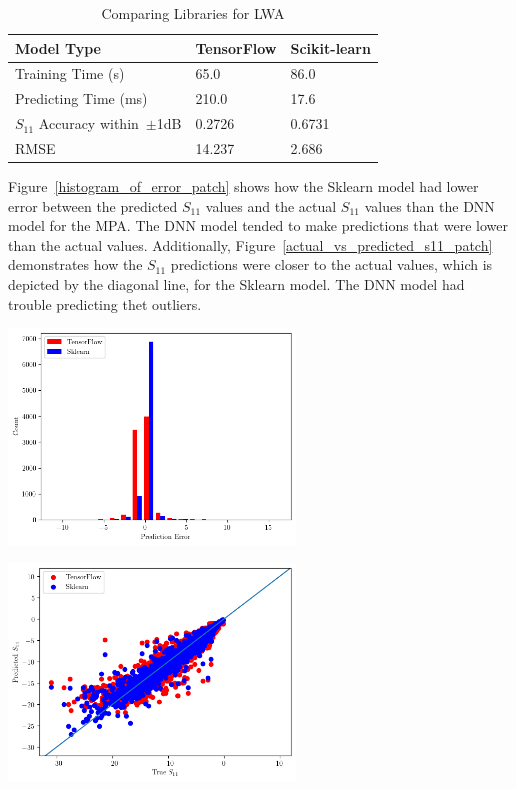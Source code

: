 \documentclass[conference]{IEEEtran}
\newenvironment{Figure}
    {\par\medskip\noindent\minipage{\linewidth}}
    {\endminipage\par\medskip}
\begin{document}
\begin{table}[h]
\caption{Comparing Libraries for LWA}
\begin{center}
\begin{tabular}{ |l|l|l| }
    \hline
    Model Type & TensorFlow & Scikit-learn \\ 
    \hline
    Training Time (s) & 65.0 & 86.0 \\  
    \hline
    Predicting Time (ms) & 210.0 & 17.6 \\
    \hline
    $S_{11}$ Accuracy within~$\pm$1dB & 0.2726 & 0.6731 \\
    \hline
    RMSE & 14.237 & 2.686 \\
    \hline
\end{tabular}
\end{center}
\label{comparing_libraries_lw}
\end{table}

Figure~\ref{histogram_of_error_patch} shows how the Sklearn model had lower error between the predicted $S_{11}$ values and the actual $S_{11}$ values than the DNN model for the MPA. The DNN model tended to make predictions that were lower than the actual values. Additionally, Figure~\ref{actual_vs_predicted_s11_patch} demonstrates how the $S_{11}$ predictions were closer to the actual values, which is depicted by the diagonal line, for the Sklearn model. The DNN model had trouble predicting thet outliers. 

\begin{Figure}
    \centering
    \includegraphics[width=3in]{histogram_patch}
    \label{histogram_of_error_patch}
\end{Figure}

\begin{Figure}
    \centering
    \includegraphics[width=3in]{actual_vs_predicted_s11_patch}
    \label{actual_vs_predicted_s11_patch}
\end{Figure}
\end{document}

